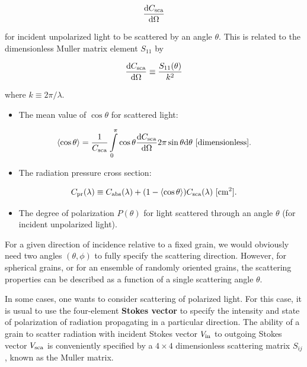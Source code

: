 \documentclass[a4paper,10pt]{article}
\begin{document}
\begin{align*}
   \frac{{\rm d}C_{\rm sca}}{{\rm d}\Omega}
\end{align*}

for incident unpolarized light to be scattered by an angle $\theta$. This is related to the dimensionless Muller matrix element $S_{11}$ by

\begin{align*}
   \frac{{\rm d}C_{\rm sca}}{{\rm d}\Omega} \equiv \frac{S_{11}(\theta)}{k^2}
\end{align*}

where $k\equiv2\pi/\lambda$.

\begin{itemize}
    \item The mean value of $\cos\theta$ for scattered light:
\end{itemize}

\begin{align*}
   \langle\cos\theta\rangle = \frac{1}{C_{\rm sca}}\int\limits_0^\pi \cos\theta \frac{{\rm d}C_{\rm sca}}{{\rm d}\Omega} 2\pi\sin\theta{\rm d}\theta ~ [{\rm dimensionless}].
\end{align*}

\begin{itemize}
    \item The radiation pressure cross section:
\end{itemize}

\begin{align*}
   C_{\rm pr}(\lambda) \equiv C_{\rm abs}(\lambda) + (1-\langle\cos\theta\rangle)C_{\rm sca}(\lambda) ~ [{\rm cm^2}].
\end{align*}

\begin{itemize}
    \item The degree of polarization $P(\theta)$ for light scattered through an angle $\theta$ (for incident unpolarized light).
\end{itemize}

{\noindent}For a given direction of incidence relative to a fixed grain, we would obviously need two angles $(\theta,\phi)$ to fully specify the scattering direction. However, for spherical grains, or for an ensemble of randomly oriented grains, the scattering properties can be described as a function of a single scattering angle $\theta$.

{\noindent}In some cases, one wants to consider scattering of polarized light. For this case, it is usual to use the four-element \textbf{Stokes vector} to specify the intensity and state of polarization of radiation propagating in a particular direction. The ability of a grain to scatter radiation with incident Stokes vector $V_{\rm in}$ to outgoing Stokes vector $V_{\rm sca}$ is conveniently specified by a $4\times4$ dimensionless scattering matrix $S_{ij}$, known as the Muller matrix.
\end{document}
